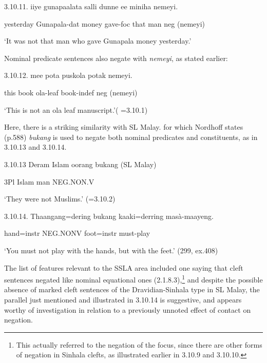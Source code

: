 \documentclass[letterpaper]{article}
\begin{document}
3.10.11. 
\ea
\gll iiye gunapaalat{\dag}a salli dunne ee miniha nemeyi.

  yesterday Gunapala-dat money gave-foc that man neg (nemeyi)

 `It was not that man who gave Gunapala money yesterday.'

Nominal predicate sentences also negate with \textit{nemeyi}, as stated earlier:

3.10.12.  mee pota puskola potak nemeyi.

 this book ola-leaf book-indef neg (nemeyi)

 `This is not an ola leaf manuscript.'( =3.10.1)

Here, there is a striking similarity with SL Malay. for which Nordhoff states (p.588) \textit{bukang} is used to negate both nominal predicates and constituents, as in 3.10.13 and 3.10.14.

3.10.13  
\ea
\gll Deram Islam oorang bukang (SL Malay)

  3Pl Islam man NEG.NON.V

  `They were not Muslims.' (=3.10.2)

3.10.14.  
\ea
\gll Thaangang=dering bukang kaaki=derring masà-maayeng.

  hand=instr NEG.NONV  foot=instr  must-play

  `You must not play with the hands, but with the feet.' (299, ex.408)

 The list of features relevant to the SSLA area included one saying that cleft sentences negated like nominal equational ones (2.1.8.3),\footnote{This
  actually referred to the negation of the focus, since there are other forms of negation in Sinhala clefts, as illustrated earlier in 3.10.9 and 3.10.10.} and despite the possible absence of marked cleft sentences of the Dravidian-Sinhala type in SL Malay, the parallel just mentioned and illustrated in 3.10.14 is suggestive, and appears worthy of investigation in relation to a previously unnoted effect of contact on negation.
\end{document}
